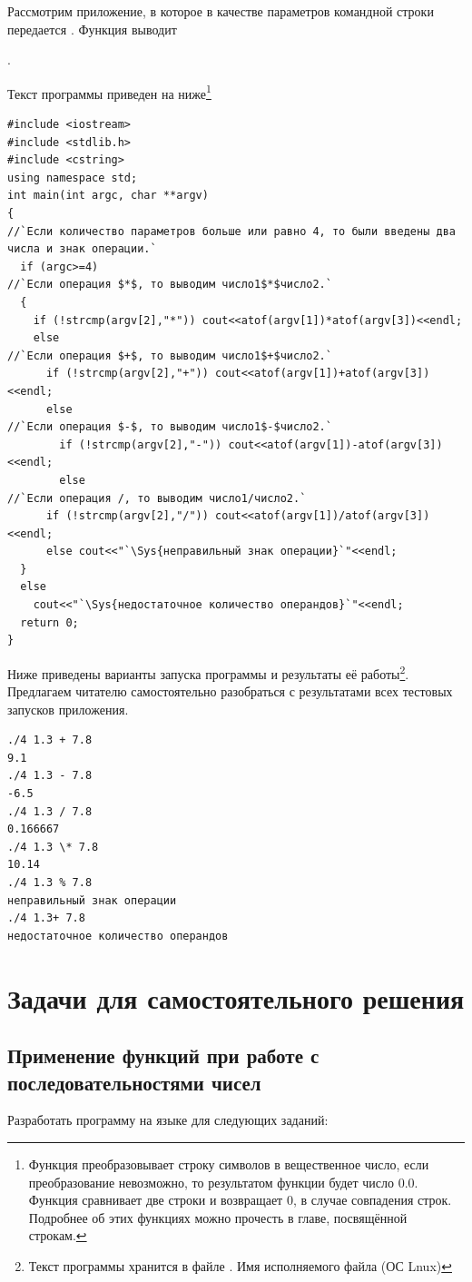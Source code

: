Рассмотрим приложение, в которое в качестве параметров командной строки 
передается . Функция выводит

.

Текст программы приведен на ниже\footnote{Функция  преобразовывает строку символов в вещественное число, если
преобразование невозможно, то результатом функции  будет число 0.0. Функция  сравнивает две строки и
возвращает 0, в случае совпадения строк. Подробнее об этих функциях можно прочесть в главе, посвящённой строкам.}
\begin{lstlisting}
#include <iostream>
#include <stdlib.h>
#include <cstring>
using namespace std;
int main(int argc, char **argv)
{
//`Если количество параметров больше или равно 4, то были введены два числа и знак операции.`
  if (argc>=4)
//`Если операция $*$, то выводим число1$*$число2.`
  {
    if (!strcmp(argv[2],"*")) cout<<atof(argv[1])*atof(argv[3])<<endl;
    else
//`Если операция $+$, то выводим число1$+$число2.`
      if (!strcmp(argv[2],"+")) cout<<atof(argv[1])+atof(argv[3])<<endl;
      else 
//`Если операция $-$, то выводим число1$-$число2.`
        if (!strcmp(argv[2],"-")) cout<<atof(argv[1])-atof(argv[3])<<endl;
        else 
//`Если операция /, то выводим число1/число2.`
	  if (!strcmp(argv[2],"/")) cout<<atof(argv[1])/atof(argv[3])<<endl;
	  else cout<<"`\Sys{неправильный знак операции}`"<<endl;	
  }
  else
    cout<<"`\Sys{недостаточное количество операндов}`"<<endl;
  return 0;
}
\end{lstlisting}

Ниже приведены варианты запуска программы и результаты её работы\footnote{Текст программы хранится в файле
. Имя исполняемого файла  (ОС Lnux)}. Предлагаем читателю самостоятельно разобраться с
результатами всех тестовых запусков приложения.
\begin{verbatim}
./4 1.3 + 7.8 
9.1 
./4 1.3 - 7.8 
-6.5 
./4 1.3 / 7.8 
0.166667 
./4 1.3 \* 7.8 
10.14 
./4 1.3 % 7.8 
неправильный знак операции 
./4 1.3+ 7.8 
недостаточное количество операндов 
\end{verbatim}

\section[Задачи для самостоятельного решения]{Задачи для самостоятельного решения}
\subsection[Применение функций при работе с последовательностями чисел]{Применение функций при работе с
последовательностями чисел}
Разработать программу на языке  для следующих заданий:

